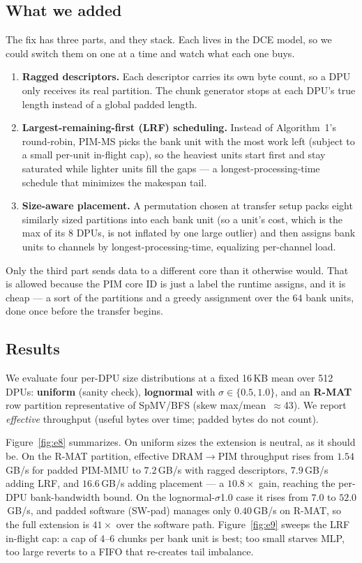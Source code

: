 \documentclass[conference]{IEEEtran}
\newcommand{\dtp}{DRAM$\rightarrow$PIM}
\begin{document}
\subsection{What we added}
The fix has three parts, and they stack. Each lives in the DCE model, so we could
switch them on one at a time and watch what each one buys.
\begin{enumerate}
\item \textbf{Ragged descriptors.} Each descriptor carries its own byte count,
so a DPU only receives its real partition. The chunk generator stops at each
DPU's true length instead of a global padded length.
\item \textbf{Largest-remaining-first (LRF) scheduling.} Instead of Algorithm~1's
round-robin, PIM-MS picks the bank unit with the most work left (subject to a
small per-unit in-flight cap), so the heaviest units start first and stay
saturated while lighter units fill the gaps --- a longest-processing-time
schedule that minimizes the makespan tail.
\item \textbf{Size-aware placement.} A permutation chosen at transfer setup
packs eight similarly sized partitions into each bank unit (so a unit's cost,
which is the max of its 8 DPUs, is not inflated by one large outlier) and then
assigns bank units to channels by longest-processing-time, equalizing per-channel
load.
\end{enumerate}
Only the third part sends data to a different core than it otherwise would. That
is allowed because the PIM core ID is just a label the runtime assigns, and it is
cheap --- a sort of the partitions and a greedy assignment over the $64$ bank
units, done once before the transfer begins.

\subsection{Results}
We evaluate four per-DPU size distributions at a fixed 16\,KB mean over 512 DPUs:
\textbf{uniform} (sanity check), \textbf{lognormal} with $\sigma\in\{0.5,1.0\}$,
and an \textbf{R-MAT} row partition representative of SpMV/BFS (skew
max/mean~$\approx$43). We report \emph{effective} throughput (useful bytes over
time; padded bytes do not count).

Figure~\ref{fig:e8} summarizes. On uniform sizes the extension is neutral, as it
should be. On the R-MAT partition, effective \dtp{} throughput rises from
$1.54$\,GB/s for padded PIM-MMU to $7.2$\,GB/s with ragged descriptors,
$7.9$\,GB/s adding LRF, and $16.6$\,GB/s adding placement --- a $10.8\times$
gain, reaching the per-DPU bank-bandwidth bound. On the lognormal-$\sigma$1.0
case it rises from $7.0$ to $52.0$\,GB/s, and padded software (SW-pad) manages
only $0.40$\,GB/s on R-MAT, so the full extension is $41\times$ over the
software path. Figure~\ref{fig:e9} sweeps
the LRF in-flight cap: a cap of 4--6 chunks per bank unit is best; too small
starves MLP, too large reverts to a FIFO that re-creates tail imbalance.
\end{document}
